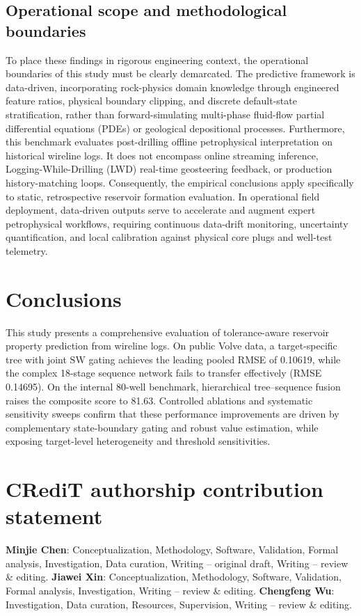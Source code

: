 \documentclass[preprint,12pt,nopreprintline]{elsarticle}
\begin{document}
\subsection{Operational scope and methodological boundaries}
To place these findings in rigorous engineering context, the operational boundaries of this study must be clearly demarcated. The predictive framework is data-driven, incorporating rock-physics domain knowledge through engineered feature ratios, physical boundary clipping, and discrete default-state stratification, rather than forward-simulating multi-phase fluid-flow partial differential equations (PDEs) or geological depositional processes. Furthermore, this benchmark evaluates post-drilling offline petrophysical interpretation on historical wireline logs. It does not encompass online streaming inference, Logging-While-Drilling (LWD) real-time geosteering feedback, or production history-matching loops. Consequently, the empirical conclusions apply specifically to static, retrospective reservoir formation evaluation. In operational field deployment, data-driven outputs serve to accelerate and augment expert petrophysical workflows, requiring continuous data-drift monitoring, uncertainty quantification, and local calibration against physical core plugs and well-test telemetry.

\section{Conclusions}
\label{sec:conclusions}
This study presents a comprehensive evaluation of tolerance-aware reservoir property prediction from wireline logs. On public Volve data, a target-specific tree with joint $\mathrm{SW}$ gating achieves the leading pooled RMSE of 0.10619, while the complex 18-stage sequence network fails to transfer effectively (RMSE 0.14695). On the internal 80-well benchmark, hierarchical tree--sequence fusion raises the composite score to 81.63. Controlled ablations and systematic sensitivity sweeps confirm that these performance improvements are driven by complementary state-boundary gating and robust value estimation, while exposing target-level heterogeneity and threshold sensitivities.

\section*{CRediT authorship contribution statement}
\textbf{Minjie Chen}: Conceptualization, Methodology, Software, Validation, Formal analysis, Investigation, Data curation, Writing -- original draft, Writing -- review \& editing. \textbf{Jiawei Xin}: Conceptualization, Methodology, Software, Validation, Formal analysis, Investigation, Writing -- review \& editing. \textbf{Chengfeng Wu}: Investigation, Data curation, Resources, Supervision, Writing -- review \& editing.
\end{document}
